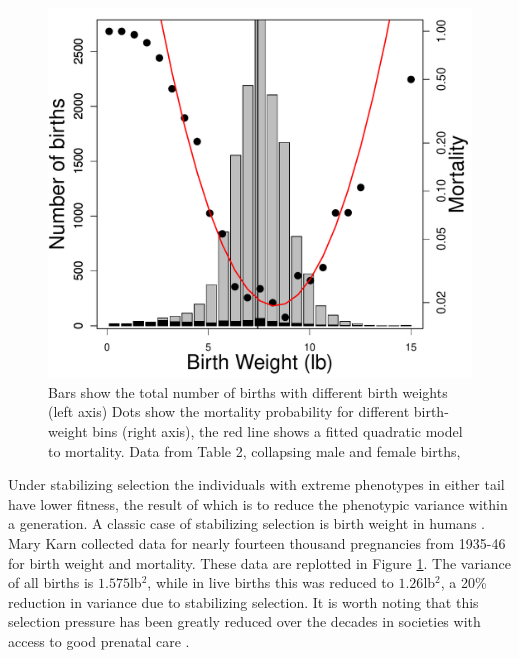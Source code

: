 

\begin{figure}
\begin{center}
\includegraphics[width= 0.6 \textwidth]{Journal_figs/Quant_gen/birth_weight/Karn_Penrose_birth_weight.pdf}
\end{center}
\caption{Bars show the total number of births with different birth
  weights (left axis)  Dots show the mortality probability for different
  birth-weight bins (right axis), the red line shows a fitted
  quadratic model to mortality. Data from \citet{karn1951birth}
  Table 2, collapsing male and female births,  } \label{fig:Birth_weight}  
\end{figure}

Under stabilizing selection the individuals with extreme phenotypes in
either tail have lower fitness, the result of which is to reduce the
phenotypic variance within a generation. A classic case of stabilizing selection
is birth weight in humans \citep{karn1951birth}. Mary Karn collected
data for nearly fourteen thousand pregnancies from 1935-46 for birth
weight and mortality. These data are replotted in Figure
\ref{fig:Birth_weight}. The variance of all births is $1.575$lb$^2$, while in live births this
was reduced to $1.26$lb$^2$, a 20\% reduction in variance due to
stabilizing selection. It is worth noting that this selection
pressure has been greatly reduced over the decades in societies with
access to good prenatal care \citep{ulizzi1992natural}.  %

